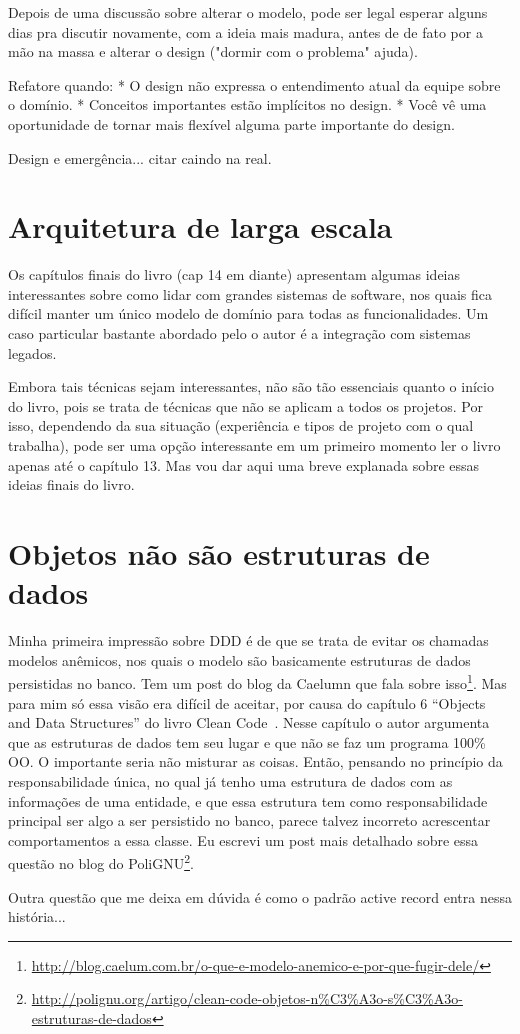 \documentclass[a4paper, 12pt]{article}
\begin{document}
Depois de uma discussão sobre alterar o modelo, pode ser legal esperar alguns dias pra discutir novamente, com a ideia mais madura, antes de de fato por a mão na massa e alterar o design ("dormir com o problema" ajuda).

Refatore quando:
* O design não expressa o entendimento atual da equipe sobre o domínio.
* Conceitos importantes estão implícitos no design.
* Você vê uma oportunidade de tornar mais flexível alguma parte importante do design.

Design e emergência... citar caindo na real.

\section{Arquitetura de larga escala}

Os capítulos finais do livro (cap 14 em diante) apresentam algumas ideias interessantes sobre como lidar com grandes sistemas de software, nos quais fica difícil manter um único modelo de domínio para todas as funcionalidades. Um caso particular bastante abordado pelo o autor é a integração com sistemas legados.

Embora tais técnicas sejam interessantes, não são tão essenciais quanto o início do livro, pois se trata de técnicas que não se aplicam a todos os projetos. Por isso, dependendo da sua situação (experiência e tipos de projeto com o qual trabalha), pode ser uma opção interessante em um primeiro momento ler o livro apenas até o capítulo 13. Mas vou dar aqui uma breve explanada sobre essas ideias finais do livro.

\section{Objetos não são estruturas de dados}

Minha primeira impressão sobre DDD é de que se trata de evitar os chamadas modelos anêmicos, nos quais o modelo são basicamente estruturas de dados persistidas no banco. Tem um post do blog da Caelumn que fala sobre isso\footnote{\url{http://blog.caelum.com.br/o-que-e-modelo-anemico-e-por-que-fugir-dele/}}. Mas para mim só essa visão era difícil de aceitar, por causa do capítulo 6 ``Objects and Data Structures'' do livro Clean Code~\cite{Bob2008Clean}. Nesse capítulo o autor argumenta que as estruturas de dados tem seu lugar e que não se faz um programa 100\% OO. O importante seria não misturar as coisas. Então, pensando no princípio da responsabilidade única, no qual já tenho uma estrutura de dados com as informações de uma entidade, e que essa estrutura tem como responsabilidade principal ser algo a ser persistido no banco, parece talvez incorreto acrescentar comportamentos a essa classe. Eu escrevi um post mais detalhado sobre essa questão no blog do PoliGNU\footnote{\url{http://polignu.org/artigo/clean-code-objetos-n\%C3\%A3o-s\%C3\%A3o-estruturas-de-dados}}.

Outra questão que me deixa em dúvida é como o padrão active record entra nessa história...



  
\end{document}
